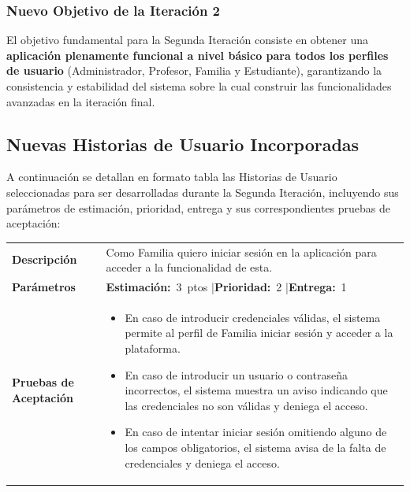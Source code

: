 \subsubsection{Nuevo Objetivo de la Iteración 2}
El objetivo fundamental para la Segunda Iteración consiste en obtener una \textbf{aplicación plenamente funcional a nivel básico para todos los perfiles de usuario} (Administrador, Profesor, Familia y Estudiante), garantizando la consistencia y estabilidad del sistema sobre la cual construir las funcionalidades avanzadas en la iteración final.

\subsection{Nuevas Historias de Usuario Incorporadas}

A continuación se detallan en formato tabla las Historias de Usuario seleccionadas para ser desarrolladas durante la Segunda Iteración, incluyendo sus parámetros de estimación, prioridad, entrega y sus correspondientes pruebas de aceptación:

\vspace{0.3cm}

\begin{center}
\begin{tabularx}{\textwidth}{|p{2.6cm}|X|}
\hline
\rowcolor{azulPastelApagado}
\multicolumn{2}{|c|}{\textbf{\color{white}HU-F1: Inicio de sesión (Familia)}} \\ \hline
\textbf{Descripción} & Como Familia quiero iniciar sesión en la aplicación para acceder a la funcionalidad de esta. \\ \hline
\textbf{Parámetros} & \mbox{\textbf{Estimación:} 3 ptos} \quad|\quad \mbox{\textbf{Prioridad:} 2} \quad|\quad \mbox{\textbf{Entrega:} 1} \\ \hline
\textbf{Pruebas de Aceptación} & 
\begin{itemize}[leftmargin=1.2em, itemsep=2pt, topsep=2pt]
    \item En caso de introducir credenciales válidas, el sistema permite al perfil de Familia iniciar sesión y acceder a la plataforma.
    \item En caso de introducir un usuario o contraseña incorrectos, el sistema muestra un aviso indicando que las credenciales no son válidas y deniega el acceso.
    \item En caso de intentar iniciar sesión omitiendo alguno de los campos obligatorios, el sistema avisa de la falta de credenciales y deniega el acceso.
\end{itemize} \\ \hline
\end{tabularx}
\end{center}


